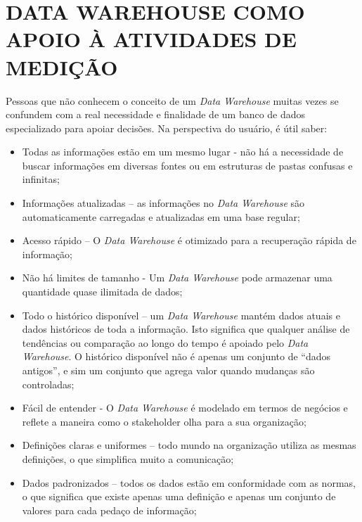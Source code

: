 \chapter[DATA WAREHOUSE COMO APOIO À ATIVIDADES DE MEDIÇÃO]{DATA WAREHOUSE COMO APOIO À ATIVIDADES DE MEDIÇÃO}
Pessoas que não conhecem o conceito de um \textit{Data Warehouse} muitas vezes se confundem com a real necessidade e finalidade de um banco de dados especializado para apoiar decisões. Na perspectiva do usuário, é útil saber\cite{pentaho2009}:
\begin{itemize}
\item Todas as informações estão em um mesmo lugar -  não há a necessidade de buscar informações em diversas fontes ou em estruturas de pastas confusas e infinitas; \cite{pentaho2009}
\item Informações atualizadas – as informações no \textit{Data Warehouse} são automaticamente carregadas e atualizadas em uma base regular; \cite{pentaho2009}
\item Acesso rápido – O \textit{Data Warehouse} é otimizado para a recuperação rápida de informação; \cite{pentaho2009}
\item Não há limites de tamanho - Um \textit{Data Warehouse} pode armazenar uma quantidade quase ilimitada de dados; \cite{pentaho2009}
\item Todo o histórico disponível – um \textit{Data Warehouse} mantém dados atuais e dados históricos de toda a informação. Isto significa que qualquer análise de tendências ou comparação ao longo do tempo é apoiado pelo \textit{Data Warehouse}. O histórico disponível não é apenas um conjunto de “dados antigos”, e sim um conjunto que agrega valor quando mudanças são controladas; \cite{pentaho2009}
\item Fácil de entender - O \textit{Data Warehouse} é modelado em termos de negócios e reflete a maneira como o stakeholder olha para a sua organização; \cite{pentaho2009}
\item Definições claras e uniformes – todo mundo na organização utiliza as mesmas definições, o que simplifica muito a comunicação; \cite{pentaho2009}
\item Dados padronizados – todos os dados estão em conformidade com as normas, o que significa que existe apenas uma definição e apenas um conjunto de valores para cada pedaço de informação; \cite{pentaho2009}
\end{itemize}


